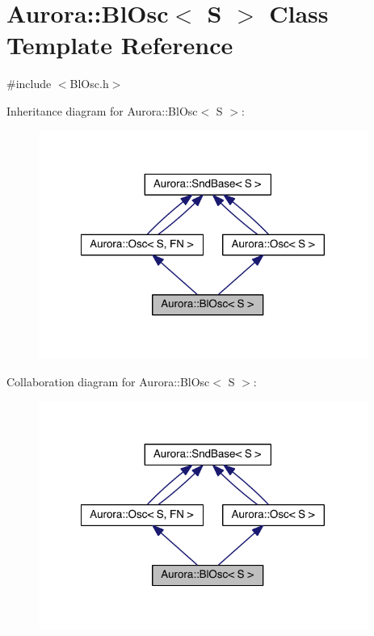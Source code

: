\hypertarget{class_aurora_1_1_bl_osc}{}\section{Aurora\+:\+:Bl\+Osc$<$ S $>$ Class Template Reference}
\label{class_aurora_1_1_bl_osc}


{\ttfamily \#include $<$Bl\+Osc.\+h$>$}



Inheritance diagram for Aurora\+:\+:Bl\+Osc$<$ S $>$\+:
\nopagebreak
\begin{figure}[H]
\begin{center}
\leavevmode
\includegraphics[width=305pt]{class_aurora_1_1_bl_osc__inherit__graph}
\end{center}
\end{figure}


Collaboration diagram for Aurora\+:\+:Bl\+Osc$<$ S $>$\+:
\nopagebreak
\begin{figure}[H]
\begin{center}
\leavevmode
\includegraphics[width=305pt]{class_aurora_1_1_bl_osc__coll__graph}
\end{center}
\end{figure}
